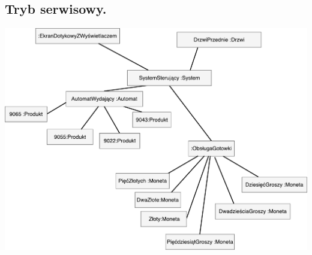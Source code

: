 \documentclass[11pt]{article}
\begin{document}
		\subsection{Tryb serwisowy.}
		\begin{center}
			\includegraphics[scale=0.65]{obiektow5.pdf}
		\end{center}
	
\end{document}
